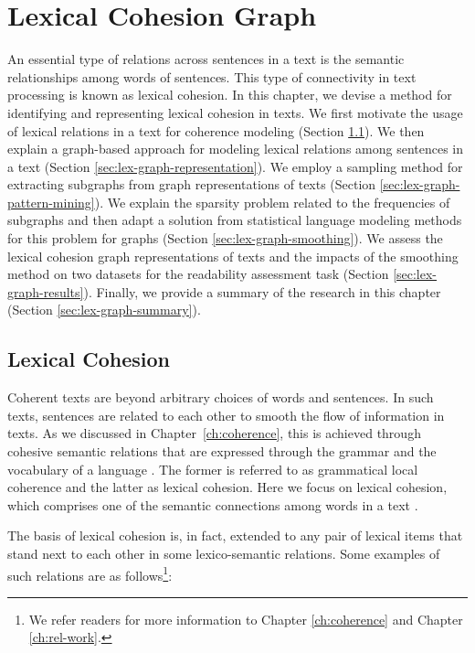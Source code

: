 
\chapter{Lexical Cohesion Graph}
\label{ch:lex-graph}

An essential type of relations across sentences in a text is the semantic relationships among words of sentences. 
This type of connectivity in text processing is known as lexical cohesion. 
In this chapter, we devise a method for identifying and representing lexical cohesion in texts. 
We first motivate the usage of lexical relations in a text for coherence modeling (Section \ref{sec:lex-graph-motivation}). 
We then explain a graph-based approach for modeling lexical relations among sentences in a text (Section \ref{sec:lex-graph-representation}). 
We employ a sampling method for extracting subgraphs from graph representations of texts (Section \ref{sec:lex-graph-pattern-mining}). 
We explain the sparsity problem related to the frequencies of subgraphs and then adapt a solution from statistical language modeling methods for this problem for graphs (Section \ref{sec:lex-graph-smoothing}). 
We assess the lexical cohesion graph representations of texts and the impacts of the smoothing method on two datasets for the readability assessment task (Section \ref{sec:lex-graph-results}). 
Finally, we provide a summary of the research in this chapter (Section \ref{sec:lex-graph-summary}).

\section{Lexical Cohesion}
\label{sec:lex-graph-motivation}

Coherent texts are beyond arbitrary choices of words and sentences.  
In such texts, sentences are related to each other to smooth the flow of information in texts. 
As we discussed in Chapter~\ref{ch:coherence}, this is achieved through cohesive semantic relations that are expressed through the grammar and the vocabulary of a language \cite{halliday76}. 
The former is referred to as grammatical local coherence and the latter as lexical cohesion. 
Here we focus on lexical cohesion, which comprises one of the semantic connections among words in a text \cite{hoey91}. 

The basis of lexical cohesion is, in fact, extended to any pair of lexical items that stand next to each other in some lexico-semantic relations. 
Some examples of such relations are as follows\footnote{We refer readers for more information to Chapter \ref{ch:coherence} and Chapter \ref{ch:rel-work}.}:  

